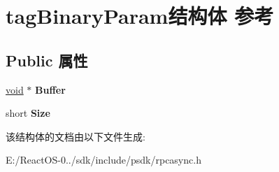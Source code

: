 \hypertarget{structtag_binary_param}{}\section{tag\+Binary\+Param结构体 参考}
\label{structtag_binary_param}
\subsection*{Public 属性}
\begin{DoxyCompactItemize}
\item 
\mbox{\label{structtag_binary_param_af6542bde2ba5f5a973b440a78034dfb9}} 
\hyperlink{interfacevoid}{void} $\ast$ {\bfseries Buffer}
\item 
\mbox{\label{structtag_binary_param_a99a6171f1f110d8a75b27ec2ee877063}} 
short {\bfseries Size}
\end{DoxyCompactItemize}


该结构体的文档由以下文件生成\+:\begin{DoxyCompactItemize}
\item 
E\+:/\+React\+O\+S-\/0../sdk/include/psdk/rpcasync.\+h\end{DoxyCompactItemize}
